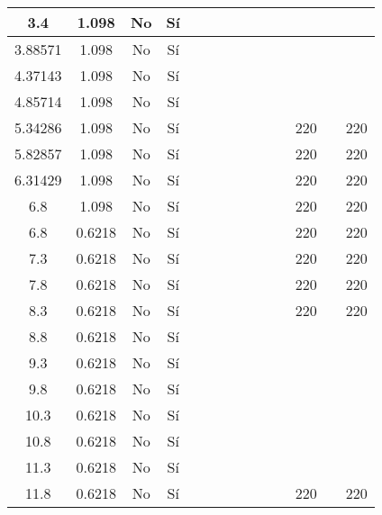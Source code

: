 \begin{table}[H]
{\begin{tabular}{|c|c|c|c|c|c|c|c|c|c|c|c|c|c|}
\hline
3.4 & 1.098 & No  & Sí  &     &     &     &     &     &     &     &     &     &  \bigstrut\\
\hline
3.88571 & 1.098 & No  & Sí  &     &     &     &     &     &     &     &     &     &  \bigstrut\\
\hline
4.37143 & 1.098 & No  & Sí  &     &     &     &     &     &     &     &     &     &  \bigstrut\\
\hline
4.85714 & 1.098 & No  & Sí  &     &     &     &     &     &     &     &     &     &  \bigstrut\\
\hline
5.34286 & 1.098 & No  & Sí  &     &     &     &     &     &     &     & 220 &     & 220 \bigstrut\\
\hline
5.82857 & 1.098 & No  & Sí  &     &     &     &     &     &     &     & 220 &     & 220 \bigstrut\\
\hline
6.31429 & 1.098 & No  & Sí  &     &     &     &     &     &     &     & 220 &     & 220 \bigstrut\\
\hline
6.8 & 1.098 & No  & Sí  &     &     &     &     &     &     &     & 220 &     & 220 \bigstrut\\
\hline
6.8 & 0.6218 & No  & Sí  &     &     &     &     &     &     &     & 220 &     & 220 \bigstrut\\
\hline
7.3 & 0.6218 & No  & Sí  &     &     &     &     &     &     &     & 220 &     & 220 \bigstrut\\
\hline
7.8 & 0.6218 & No  & Sí  &     &     &     &     &     &     &     & 220 &     & 220 \bigstrut\\
\hline
8.3 & 0.6218 & No  & Sí  &     &     &     &     &     &     &     & 220 &     & 220 \bigstrut\\
\hline
8.8 & 0.6218 & No  & Sí  &     &     &     &     &     &     &     &     &     &  \bigstrut\\
\hline
9.3 & 0.6218 & No  & Sí  &     &     &     &     &     &     &     &     &     &  \bigstrut\\
\hline
9.8 & 0.6218 & No  & Sí  &     &     &     &     &     &     &     &     &     &  \bigstrut\\
\hline
10.3 & 0.6218 & No  & Sí  &     &     &     &     &     &     &     &     &     &  \bigstrut\\
\hline
10.8 & 0.6218 & No  & Sí  &     &     &     &     &     &     &     &     &     &  \bigstrut\\
\hline
11.3 & 0.6218 & No  & Sí  &     &     &     &     &     &     &     &     &     &  \bigstrut\\
\hline
11.8 & 0.6218 & No  & Sí  &     &     &     &     &     &     &     & 220 &     & 220 \bigstrut\\

\end{tabular}}
\end{table}
